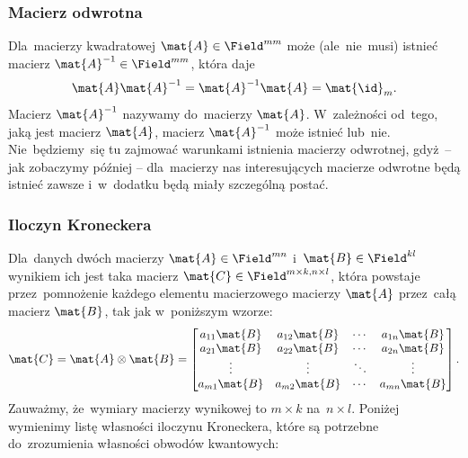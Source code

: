 \subsubsection{Macierz odwrotna}
Dla~macierzy kwadratowej $\mat{A}\in \Field^{mm}$ może (ale~nie~musi) istnieć macierz $\mat{A}^{-1}\in \Field^{mm}$, która daje
$$
	\mat{A}\mat{A}^{-1} = \mat{A}^{-1}\mat{A} = \mat{\id}_m.
$$
Macierz $\mat{A}^{-1}$ nazywamy  do~macierzy $\mat{A}$.
W~zależności od~tego, jaką jest macierz $\mat{A}$,
macierz $\mat{A}^{-1}$ może istnieć lub~nie. Nie~będziemy~się tu zajmować
warunkami istnienia macierzy odwrotnej, gdyż~-- jak zobaczymy później --
dla~macierzy nas interesujących macierze odwrotne będą istnieć zawsze i~w~dodatku
będą miały szczególną postać.

\subsubsection{Iloczyn Kroneckera}
Dla~danych dwóch macierzy $\mat{A}\in\Field^{mn}$ i~$\mat{B}\in\Field^{kl}$
wynikiem ich  jest taka macierz
$\mat{C}\in\Field^{m\times k, n\times l}$, która
powstaje przez~pomnożenie każdego elementu macierzowego macierzy $\mat{A}$
przez~całą macierz $\mat{B}$, tak jak w~poniższym wzorze:
$$
	\mat{C}=\mat{A}\otimes \mat{B}=
	\begin{bmatrix}
		a_{11}\mat{B} & a_{12}\mat{B} & \cdots & a_{1n}\mat{B} \\
		a_{21}\mat{B} & a_{22}\mat{B} & \cdots & a_{2n}\mat{B} \\
		\vdots        & \vdots        & \ddots & \vdots        \\
		a_{m1}\mat{B} & a_{m2}\mat{B} & \cdots & a_{mn}\mat{B} \\
	\end{bmatrix}.
$$
Zauważmy, że~wymiary macierzy wynikowej to $m\times k$ na~$n\times l$. Poniżej
wymienimy listę własności iloczynu Kroneckera, które są potrzebne
do~zrozumienia własności obwodów kwantowych:

